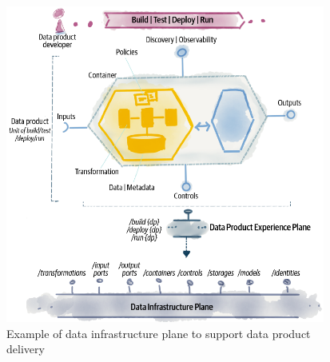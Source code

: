 \documentclass[12pt, a4paper]{book}
\begin{document}
\begin{figure}[ht]
	\begin{framed}
		\centering
		\vspace*{-.3cm}
		\includegraphics[width=10.5cm]{DataInfras.png}
		\caption{Example of data infrastructure plane to support data product delivery}
		\label{DataInfras}
	\end{framed}
\end{figure}
\end{document}
